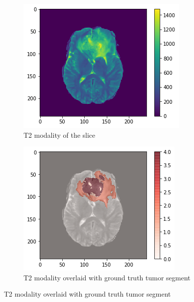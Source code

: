 \begin{figure}[H]
    \centering
    \begin{subfigure}{.33\textwidth}
        \centering
        \includegraphics[width=\linewidth]{chapters/07_brats3d/images/03_t2.png}
        \caption{T2 modality of the slice}
    \end{subfigure}%
    \begin{subfigure}{.33\textwidth}
        \centering
        \includegraphics[width=\linewidth]{chapters/07_brats3d/images/07_t2_segment.png}
        \caption{T2 modality overlaid with ground truth tumor segment}

\end{subfigure}
\end{figure}
